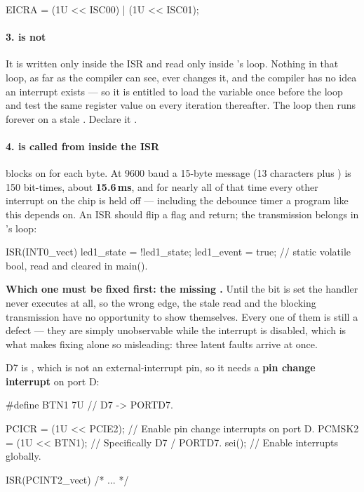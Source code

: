 \begin{ccode}
EICRA = (1U << ISC00) | (1U << ISC01);
\end{ccode}

\paragraph{3.  is not }
It is written only inside the ISR and read only inside 's loop. Nothing in that loop,
as far as the compiler can see, ever changes it, and the compiler has no idea an interrupt exists
--- so it is entitled to load the variable once before the loop and test the same register value on
every iteration thereafter. The loop then runs forever on a stale . Declare it
.

\paragraph{4.  is called from inside the ISR}
 blocks on  for each byte. At 9600 baud a 15-byte message (13
characters plus \code{\r\n}) is 150 bit-times, about \textbf{15.6\,ms}, and for nearly all of that
time every other interrupt on the chip is held off --- including the debounce timer a program like
this depends on. An ISR should flip a flag and return; the transmission belongs in 's
loop:

\begin{ccode}
ISR(INT0_vect)
{
    led1_state = !led1_state;
    led1_event = true;   // static volatile bool, read and cleared in main().
}
\end{ccode}

\textbf{Which one must be fixed first: the missing .} Until the  bit is set the
handler never executes at all, so the wrong edge, the stale read and the blocking transmission have
no opportunity to show themselves. Every one of them is still a defect --- they are simply
unobservable while the interrupt is disabled, which is what makes fixing  alone so
misleading: three latent faults arrive at once. 

D7 is , which is not an external-interrupt pin, so it needs a \textbf{pin change
interrupt} on port D:

\begin{ccode}
#define BTN1 7U // D7 -> PORTD7.

PCICR  = (1U << PCIE2);  // Enable pin change interrupts on port D.
PCMSK2 = (1U << BTN1);   // Specifically D7 / PORTD7.
sei();                   // Enable interrupts globally.

ISR(PCINT2_vect) { /* ... */ }
\end{ccode}

